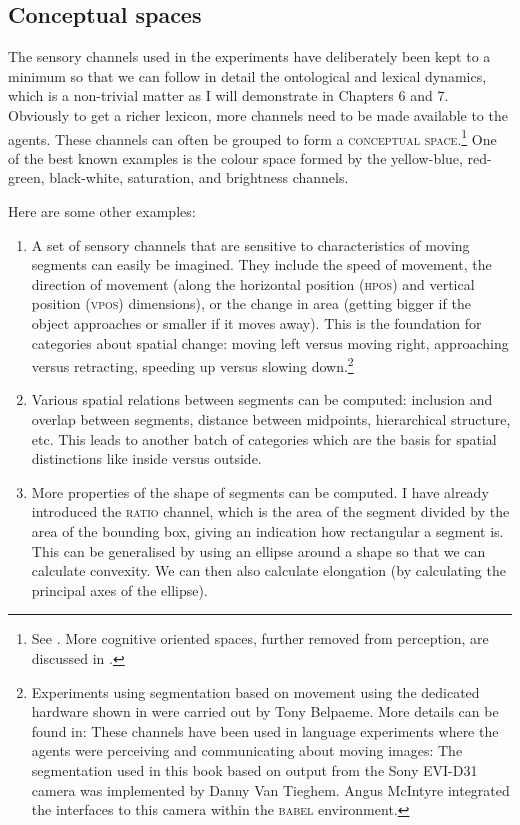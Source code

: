 \subsection{Conceptual spaces}

The sensory channels used in the experiments have
deliberately been kept to a minimum so that we can follow 
in detail the ontological and lexical dynamics, which is a 
non-trivial matter as I will demonstrate in Chapters 6 and 7.
Obviously to get a richer lexicon, more channels need to be made 
available to the agents. These channels can often be 
grouped to form a {\scshape conceptual space}.\footnote{See \cite{Gardenfors:1999}. 
More cognitive oriented spaces, further removed 
from perception, are discussed in \cite{Fauconnier:1994}.} One of the 
best known examples is the colour space formed by the
yellow-blue, red-green, black-white, saturation, and brightness channels. 

\clearpage
Here are some other examples: 
\begin{enumerate}
\item A set of sensory channels that are sensitive 
to characteristics of moving segments can easily be 
imagined. They include the speed
of movement, the direction of movement (along the 
horizontal position (\textsc{hpos}) and vertical position (\textsc{vpos}) 
dimensions), or the change in area (getting bigger if the object 
approaches or smaller if it moves away). This is the foundation
for categories about spatial change: moving left versus moving right,
approaching versus retracting, speeding up versus slowing down.\footnote{Experiments
using segmentation based on movement
using the dedicated hardware shown in  were carried out by Tony Belpaeme. 
More details can be found in: \cite{Belpaeme:1998} These channels have been used in
language experiments where the agents were 
perceiving and communicating about moving 
images: \cite{Steels:1998}  
The segmentation used in this book 
based on output from the Sony EVI-D31 camera was 
implemented by Danny Van Tieghem. Angus McIntyre integrated
the interfaces to this camera within the \textsc{babel} environment. 
}

\item Various spatial relations between segments can be computed: 
inclusion and overlap between segments, distance between 
midpoints, hierarchical structure, etc. 
This leads to another batch of categories which are
the basis for spatial distinctions like inside versus outside. 

\item More properties of the shape of segments can be computed.
I have already introduced the \textsc{ratio} channel, which is the area of the 
segment divided by the area of the bounding box, giving an 
indication how rectangular a segment is. This can be generalised
by using an ellipse around a shape so that we can calculate
convexity. We can then also calculate elongation (by calculating
the principal axes of the ellipse). 
\end{enumerate}

